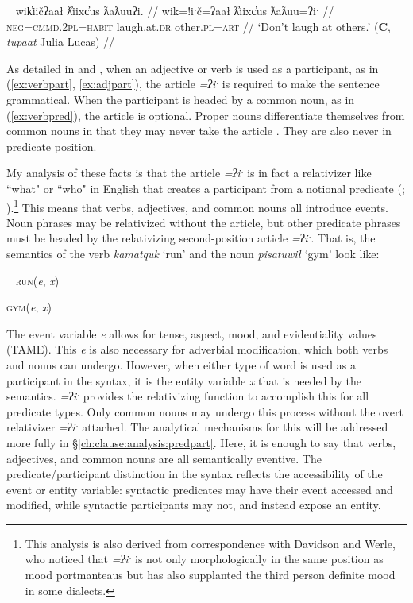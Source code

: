 \ex~ \label{ex:adjpart}
\begingl
\glpreamble wik̓iičʔaał ƛ̓iixc̓us ƛaƛuuʔi. //
\gla wik=!iˑč=ʔaał ƛ̓iixc̓us ƛaƛuu=ʔiˑ //
\glb \textsc{neg}=\textsc{cmmd.2pl}=\textsc{habit} laugh.at.\textsc{dr} other.\textsc{pl}=\textsc{art} //
\glft `Don't laugh at others.' (\textbf{C}, \textit{tupaat} Julia Lucas) //
\endgl
\xe


As detailed in \citet{jacobsen1979} and \citet{wojdak2001}, when an adjective or verb is used as a participant, as in (\ref{ex:verbpart}, \ref{ex:adjpart}), the article \textit{=ʔiˑ} is required to make the sentence grammatical. When the participant is headed by a common noun, as in (\ref{ex:verbpred}), the article is optional. Proper nouns differentiate themselves from common nouns in that they may never take the article \citep{inman2018}. They are also never in predicate position.

My analysis of these facts is that the article \textit{=ʔiˑ} is in fact a relativizer like ``what" or ``who" in English that creates a participant from a notional predicate (\citealt[p.~136]{davidson2002}; \citealt{inman2018}).\footnote{This analysis is also derived from correspondence with Davidson and Werle, who noticed that \textit{=ʔiˑ} is not only morphologically in the same position as mood portmanteaus but has also supplanted the third person definite mood in some dialects.} This means that verbs, adjectives, and common nouns all introduce events. Noun phrases may be relativized without the article, but other predicate phrases must be headed by the relativizing second-position article \textit{=ʔiˑ}. That is, the semantics of the verb \textit{kamatquk} `run' and the noun \textit{pisatuwił} `gym' look like:

\ex~
\textsc{run}(\textit{e}, \textit{x})

\textsc{gym}(\textit{e}, \textit{x})
\xe

\vspace{-25pt}

The event variable \textit{e} allows for tense, aspect, mood, and evidentiality values (TAME). This \textit{e} is also necessary for adverbial modification, which both verbs and nouns can undergo. However, when either type of word is used as a participant in the syntax, it is the entity variable \textit{x} that is needed by the semantics. \textit{=ʔiˑ} provides the relativizing function to accomplish this for all predicate types. Only common nouns may undergo this process without the overt relativizer \textit{=ʔiˑ} attached. The analytical mechanisms for this will be addressed more fully in \S\ref{ch:clause:analysis:predpart}. Here, it is enough to say that verbs, adjectives, and common nouns are all semantically eventive. The predicate/participant distinction in the syntax reflects the accessibility of the event or entity variable: syntactic predicates may have their event accessed and modified, while syntactic participants may not, and instead expose an entity.

